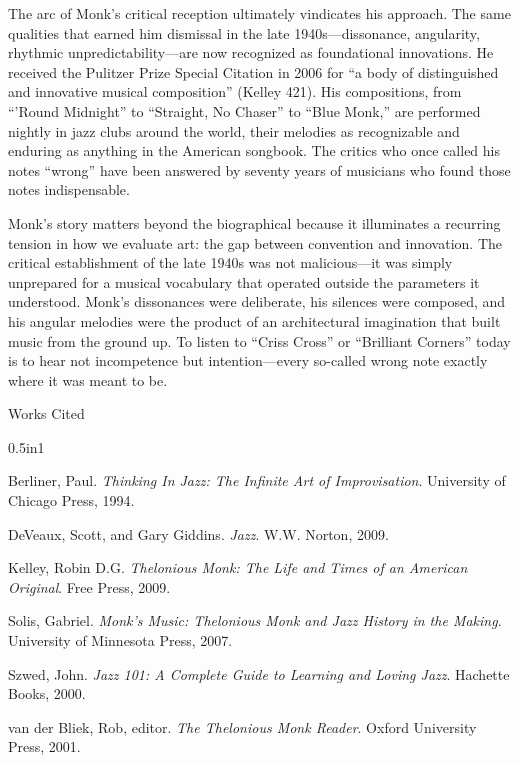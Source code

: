 \documentclass[12pt]{article}
\begin{document}
The arc of Monk's critical reception ultimately vindicates his approach. The same qualities that earned him dismissal in the late 1940s---dissonance, angularity, rhythmic unpredictability---are now recognized as foundational innovations. He received the Pulitzer Prize Special Citation in 2006 for ``a body of distinguished and innovative musical composition'' (Kelley 421). His compositions, from ``'Round Midnight'' to ``Straight, No Chaser'' to ``Blue Monk,'' are performed nightly in jazz clubs around the world, their melodies as recognizable and enduring as anything in the American songbook. The critics who once called his notes ``wrong'' have been answered by seventy years of musicians who found those notes indispensable.

Monk's story matters beyond the biographical because it illuminates a recurring tension in how we evaluate art: the gap between convention and innovation. The critical establishment of the late 1940s was not malicious---it was simply unprepared for a musical vocabulary that operated outside the parameters it understood. Monk's dissonances were deliberate, his silences were composed, and his angular melodies were the product of an architectural imagination that built music from the ground up. To listen to ``Criss Cross'' or ``Brilliant Corners'' today is to hear not incompetence but intention---every so-called wrong note exactly where it was meant to be.

\newpage

\begin{center}
Works Cited
\end{center}

\begin{hangparas}{0.5in}{1}

Berliner, Paul. \textit{Thinking In Jazz: The Infinite Art of Improvisation}. University of Chicago Press, 1994.

DeVeaux, Scott, and Gary Giddins. \textit{Jazz}. W.W. Norton, 2009.

Kelley, Robin D.G. \textit{Thelonious Monk: The Life and Times of an American Original}. Free Press, 2009.

Solis, Gabriel. \textit{Monk's Music: Thelonious Monk and Jazz History in the Making}. University of Minnesota Press, 2007.

Szwed, John. \textit{Jazz 101: A Complete Guide to Learning and Loving Jazz}. Hachette Books, 2000.

van der Bliek, Rob, editor. \textit{The Thelonious Monk Reader}. Oxford University Press, 2001.

\end{hangparas}
\end{document}
